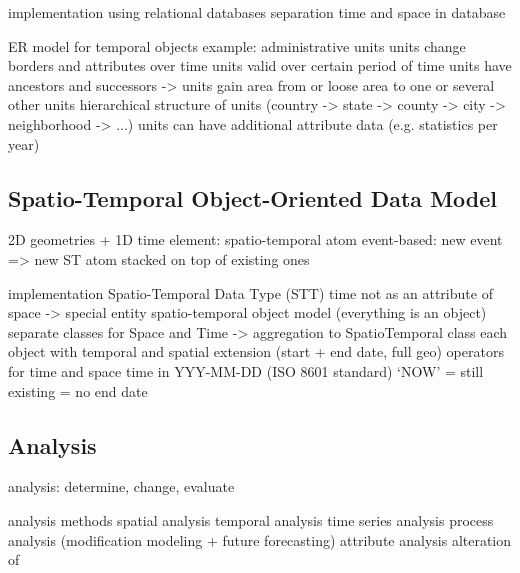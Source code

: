 implementation using relational databases
separation time and space in database

ER model for temporal objects
  example: administrative units
  units change borders and attributes over time
  units valid over certain period of time
  units have ancestors and successors
  -> units gain area from or loose area to one or several other units
  hierarchical structure of units (country -> state -> county -> city -> neighborhood -> ...)
  units can have additional attribute data (e.g. statistics per year)
  \cite[p. 67-68]{ott2001time}



\subsection{Spatio-Temporal Object-Oriented Data Model} %
\label{sub:spatio_temporal_object_oriented_data_model}

2D geometries + 1D time
element: spatio-temporal atom
event-based: new event => new ST atom stacked on top of existing ones


implementation
  Spatio-Temporal Data Type (STT)
    time not as an attribute of space -> special entity
    spatio-temporal object model (everything is an object)
      separate classes for Space and Time
      -> aggregation to SpatioTemporal class
      each object with temporal and spatial extension (start + end date, full geo)
    operators for time and space
    time in YYY-MM-DD (ISO 8601 standard)
      `NOW' = still existing = no end date
    \cite{raza12}



\subsection{Analysis} %
\label{sub:analysis}


analysis: determine, change, evaluate

analysis methods
  spatial analysis
  temporal analysis
    time series analysis
    process analysis      (modification modeling + future forecasting)
  attribute analysis
alteration of \cite[p. 128]{ott2001time}

